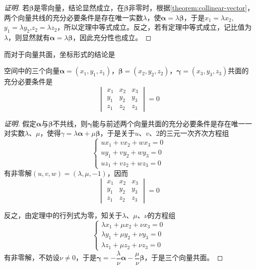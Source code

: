 \begin{proof}[证明]
 若$\bm{\beta}$是零向量，结论显然成立，在$\bm{\beta}$非零时，根据\autoref{theorem:collinear-vector}，两个向量共线的充分必要条件是存在唯一实数$\lambda$，使$\bm{\alpha} = \lambda \bm{\beta}$，于是$x_1=\lambda x_2$,$y_1 = \lambda y_2$,$z_2=\lambda z_2$，所以定理中等式成立。反之，若有定理中等式成立，记比值为$\lambda$，则显然就有$\bm{\alpha}=\lambda \bm{\beta}$，因此充分性也成立。
\end{proof}

而对于向量共面，坐标形式的结论是
\begin{theorem}
  \label{theorem:coplanear-vector-cordination}
  空间中的三个向量$\bm{\alpha}=(x_1,y_1,z_1)$，$\bm{\beta}=(x_2,y_2,z_2)$，$\bm{\gamma}=(x_3,y_3,z_3)$共面的充分必要条件是
\[
  \begin{vmatrix}
    x_1 & x_2 & x_3\\
    y_1 & y_2 & y_3 \\
    z_1 & z_2 & z_3 
  \end{vmatrix}
  = 0
\]
\end{theorem}

\begin{proof}[证明]
假定$\bm{\alpha}$与$\bm{\beta}$不共线，则$\bm{\gamma}$能与前述两个向量共面的充分必要条件是存在唯一一对实数$\lambda$、$\mu$，使得$\gamma=\lambda \bm{\alpha} + \mu \bm{\beta}$，于是关于$u$、$v$、$2$的三元一次齐次方程组
\[
  \left\{
    \begin{array}{lll}
      u x_1 + v x_2 + w x_3 = 0  \\
      u y_1 + v y_2 + w y_3 = 0 \\
      u z_1 + v z_2 + w z_3 = 0
    \end{array}
    \right.
\]
有非零解$(u,v,w)=(\lambda, \mu, -1)$，因而
\[
  \begin{vmatrix}
    x_1 & x_2 & x_3\\
    y_1 & y_2 & y_3 \\
    z_1 & z_2 & z_3 
  \end{vmatrix}
  = 0
\]

反之，由定理中的行列式为零，知关于$\lambda$、$\mu$、$\nu$的方程组
\[
  \left\{
    \begin{array}{lll}
      \lambda x_1 + \mu x_2 + \nu x_3 = 0  \\
      \lambda y_1 + \mu y_2 + \nu y_3 = 0 \\
      \lambda z_1 + \mu z_2 + \nu z_3 = 0
    \end{array}
    \right.
\]
有非零解，不妨设$\nu \neq 0$，于是$\bm{\gamma} = -\dfrac{\lambda}{\nu} \bm{\alpha} - \dfrac{\mu}{\nu} \bm{\beta}$，于是三个向量共面。
\end{proof}


